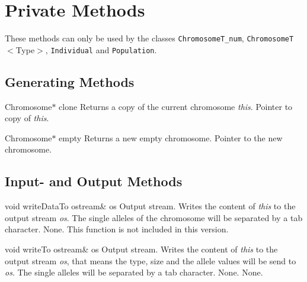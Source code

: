 \section{Private Methods}

These methods can only be used by the classes {\tt ChromosomeT\_num}, 
{\tt ChromosomeT}$<$Type$>$, {\tt Individual} and {\tt Population}.

\subsection{Generating Methods}

    \setConstInstance   
    \printEmptyMethodReturn
    {Chromosome$\ast$} 
    {clone}
    {Returns a copy of the current chromosome {\em this}.}
    {Pointer to copy of {\em this}.}

\vspace*{4ex}

    \printEmptyMethodReturn
    {Chromosome$\ast$} 
    {empty}
    {Returns a new empty chromosome.}
    {Pointer to the new chromosome.}

\clearpage

\subsection{Input- and Output Methods}

    \printMethodWithOneParam
    {void} 
    {writeDataTo}
    {ostream\&} 
    {os} 
    {Output stream.}
    {Writes the content of {\em this} to the output stream {\em os}.
The single alleles of the chromosome will be separated by a tab character.}
    {None.}
    {This function is not included in this version.}
    \setNormalInstance

\vspace*{4ex}

    \setConstInstance
    \printMethodWithOneParam
    {void}
    {writeTo}
    {ostream\&} 
    {os} 
    {Output stream.}
    {Writes the content of {\em this} to the output stream {\em os},
that means the type, size and the allele values will be send to 
{\em os}. The single alleles will be separated by a tab
character.}
    {None.}
    {None.}

